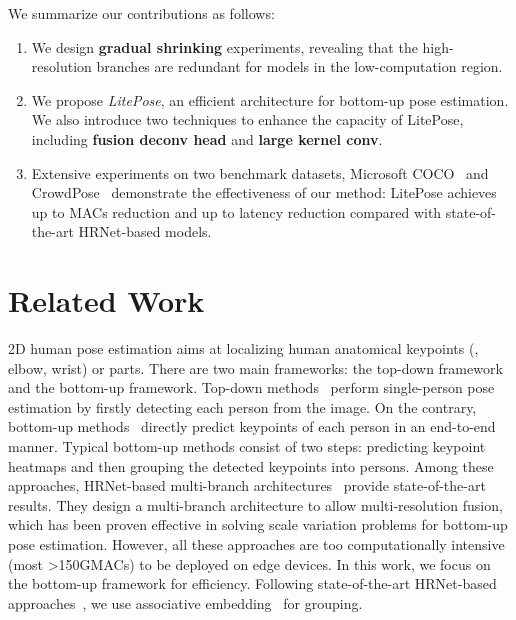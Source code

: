 \documentclass[10pt,twocolumn,letterpaper]{article}
\begin{document}
We summarize our contributions as follows:
\begin{enumerate}
    \item We design \textbf{gradual shrinking} experiments, revealing that the high-resolution branches are redundant for models in the low-computation region.
    \item We propose \textit{LitePose}, an efficient architecture for bottom-up pose estimation. We also introduce two techniques to enhance the capacity of LitePose, including \textbf{fusion deconv head} and \textbf{large kernel conv}.
    \item Extensive experiments on two benchmark datasets, Microsoft COCO~\cite{lin2014microsoft} and CrowdPose~\cite{li2019crowdpose}  demonstrate the effectiveness of our method: LitePose achieves up to  MACs reduction and up to  latency reduction compared with state-of-the-art HRNet-based models.
\end{enumerate}
 \section{Related Work}


2D human pose estimation aims at localizing human anatomical keypoints (\eg, elbow, wrist) or parts. There are two main frameworks: the top-down framework and the bottom-up framework. Top-down methods~\cite{kendall2015posenet,fang2017rmpe,he2017mask,wei2016convolutional,newell2016stacked,xiao2018simple,chen2018cascaded,sun2019deep} perform single-person pose estimation by firstly detecting each person from the image. On the contrary, bottom-up methods~\cite{newell2016stacked,pishchulin2016deepcut,insafutdinov2016deepercut,cao2019openpose,kreiss2019pifpaf,newell2016associative,cheng2020higherhrnet,geng2021bottom,jin2020differentiable,papandreou2018personlab} directly predict keypoints of each person in an end-to-end manner. Typical bottom-up methods consist of two steps: predicting keypoint heatmaps and then grouping the detected keypoints into persons. Among these approaches, HRNet-based multi-branch architectures~\cite{cheng2020higherhrnet,geng2021bottom} provide state-of-the-art results. They design a multi-branch architecture to allow multi-resolution fusion, which has been proven effective in solving scale variation problems for bottom-up pose estimation. However, all these approaches are too computationally intensive (most >150GMACs) to be deployed on edge devices. In this work, we focus on the bottom-up framework for efficiency. Following state-of-the-art HRNet-based approaches~\cite{cheng2020higherhrnet}, we use associative embedding~\cite{newell2016associative} for grouping.
\end{document}
